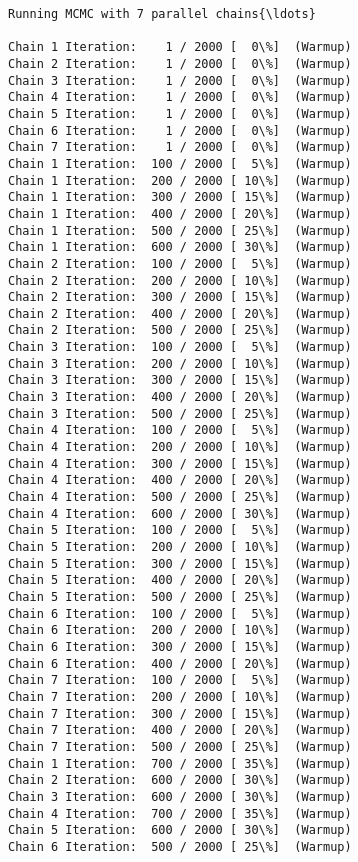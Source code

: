 \documentclass[11pt]{article}
\begin{document}
    \begin{Verbatim}[commandchars=\\\{\}]
Running MCMC with 7 parallel chains{\ldots}

Chain 1 Iteration:    1 / 2000 [  0\%]  (Warmup)
Chain 2 Iteration:    1 / 2000 [  0\%]  (Warmup)
Chain 3 Iteration:    1 / 2000 [  0\%]  (Warmup)
Chain 4 Iteration:    1 / 2000 [  0\%]  (Warmup)
Chain 5 Iteration:    1 / 2000 [  0\%]  (Warmup)
Chain 6 Iteration:    1 / 2000 [  0\%]  (Warmup)
Chain 7 Iteration:    1 / 2000 [  0\%]  (Warmup)
Chain 1 Iteration:  100 / 2000 [  5\%]  (Warmup)
Chain 1 Iteration:  200 / 2000 [ 10\%]  (Warmup)
Chain 1 Iteration:  300 / 2000 [ 15\%]  (Warmup)
Chain 1 Iteration:  400 / 2000 [ 20\%]  (Warmup)
Chain 1 Iteration:  500 / 2000 [ 25\%]  (Warmup)
Chain 1 Iteration:  600 / 2000 [ 30\%]  (Warmup)
Chain 2 Iteration:  100 / 2000 [  5\%]  (Warmup)
Chain 2 Iteration:  200 / 2000 [ 10\%]  (Warmup)
Chain 2 Iteration:  300 / 2000 [ 15\%]  (Warmup)
Chain 2 Iteration:  400 / 2000 [ 20\%]  (Warmup)
Chain 2 Iteration:  500 / 2000 [ 25\%]  (Warmup)
Chain 3 Iteration:  100 / 2000 [  5\%]  (Warmup)
Chain 3 Iteration:  200 / 2000 [ 10\%]  (Warmup)
Chain 3 Iteration:  300 / 2000 [ 15\%]  (Warmup)
Chain 3 Iteration:  400 / 2000 [ 20\%]  (Warmup)
Chain 3 Iteration:  500 / 2000 [ 25\%]  (Warmup)
Chain 4 Iteration:  100 / 2000 [  5\%]  (Warmup)
Chain 4 Iteration:  200 / 2000 [ 10\%]  (Warmup)
Chain 4 Iteration:  300 / 2000 [ 15\%]  (Warmup)
Chain 4 Iteration:  400 / 2000 [ 20\%]  (Warmup)
Chain 4 Iteration:  500 / 2000 [ 25\%]  (Warmup)
Chain 4 Iteration:  600 / 2000 [ 30\%]  (Warmup)
Chain 5 Iteration:  100 / 2000 [  5\%]  (Warmup)
Chain 5 Iteration:  200 / 2000 [ 10\%]  (Warmup)
Chain 5 Iteration:  300 / 2000 [ 15\%]  (Warmup)
Chain 5 Iteration:  400 / 2000 [ 20\%]  (Warmup)
Chain 5 Iteration:  500 / 2000 [ 25\%]  (Warmup)
Chain 6 Iteration:  100 / 2000 [  5\%]  (Warmup)
Chain 6 Iteration:  200 / 2000 [ 10\%]  (Warmup)
Chain 6 Iteration:  300 / 2000 [ 15\%]  (Warmup)
Chain 6 Iteration:  400 / 2000 [ 20\%]  (Warmup)
Chain 7 Iteration:  100 / 2000 [  5\%]  (Warmup)
Chain 7 Iteration:  200 / 2000 [ 10\%]  (Warmup)
Chain 7 Iteration:  300 / 2000 [ 15\%]  (Warmup)
Chain 7 Iteration:  400 / 2000 [ 20\%]  (Warmup)
Chain 7 Iteration:  500 / 2000 [ 25\%]  (Warmup)
Chain 1 Iteration:  700 / 2000 [ 35\%]  (Warmup)
Chain 2 Iteration:  600 / 2000 [ 30\%]  (Warmup)
Chain 3 Iteration:  600 / 2000 [ 30\%]  (Warmup)
Chain 4 Iteration:  700 / 2000 [ 35\%]  (Warmup)
Chain 5 Iteration:  600 / 2000 [ 30\%]  (Warmup)
Chain 6 Iteration:  500 / 2000 [ 25\%]  (Warmup)

\end{Verbatim}
\end{document}
